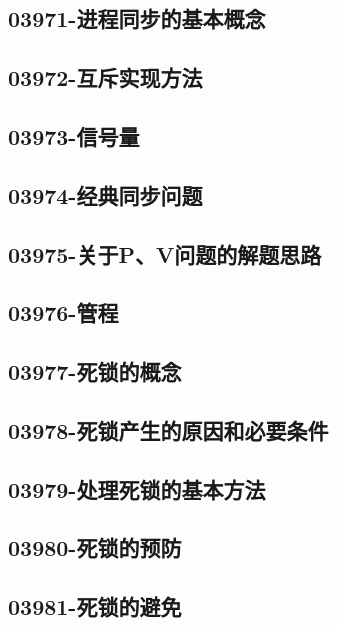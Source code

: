 \subsection{03971-进程同步的基本概念}

\subsection{03972-互斥实现方法}

\subsection{03973-信号量}

\subsection{03974-经典同步问题}

\subsection{03975-关于P、V问题的解题思路}

\subsection{03976-管程}

\subsection{03977-死锁的概念}

\subsection{03978-死锁产生的原因和必要条件}

\subsection{03979-处理死锁的基本方法}

\subsection{03980-死锁的预防}

\subsection{03981-死锁的避免}

